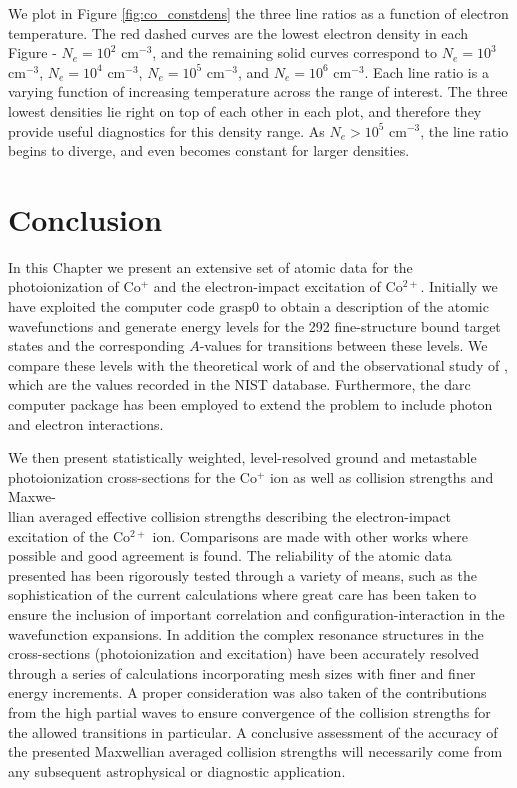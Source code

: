 We plot in Figure \ref{fig:co_constdens} the three line ratios as a function of electron temperature. The red dashed curves are the lowest electron density in each Figure - $N_e = 10^2$ cm$^{-3}$, and the remaining solid curves correspond to $N_e = 10^3$ cm$^{-3}$, $N_e = 10^4$ cm$^{-3}$, $N_e = 10^5$ cm$^{-3}$, and $N_e = 10^6$ cm$^{-3}$. Each line ratio is a varying function of increasing temperature across the range of interest. The three lowest densities lie right on top of each other in each plot, and therefore they provide useful diagnostics for this density range. As $N_e > 10^5$ cm$^{-3}$, the line ratio begins to diverge, and even becomes constant for larger densities.

\newpage
\section{Conclusion}\label{sec:co_conclusions}
In this Chapter we present an extensive set of atomic data for the photoionization of Co$^{+}$ and the electron-impact excitation of Co$^{2+}$. Initially we have exploited the computer code {\sc grasp}0 to obtain a description of the atomic wavefunctions and generate energy levels for the 292 fine-structure bound target states and the corresponding $A$-values for transitions between these levels. We compare these levels with the theoretical work of \citet{2016MNRAS.tmp..556S} and the observational study of \citet{1985aeli.book.....S}, which are the values recorded in the NIST database. Furthermore, the {\sc darc} computer package has been employed to extend the problem to include photon and electron interactions. 

We then present statistically weighted, level-resolved ground and metastable photoionization cross-sections for the Co$^{+}$ ion as well as collision strengths and Maxwe-\\llian averaged effective collision strengths describing the electron-impact excitation of the Co$^{2+}$ ion. Comparisons are made with other works where possible and good agreement is found. The reliability of the atomic data presented has been rigorously tested through a variety of means, such as the sophistication of the current calculations where great care has been taken to ensure the inclusion of important correlation and configuration-interaction in the wavefunction expansions. In addition the complex resonance structures in the cross-sections (photoionization and excitation) have been accurately resolved through a series of calculations incorporating mesh sizes with finer and finer energy increments. A proper consideration was also taken of the contributions from the high partial waves to ensure convergence of the collision strengths for the allowed transitions in particular. A conclusive assessment of the accuracy of the presented Maxwellian averaged collision strengths will necessarily come from any subsequent astrophysical or diagnostic application. 

